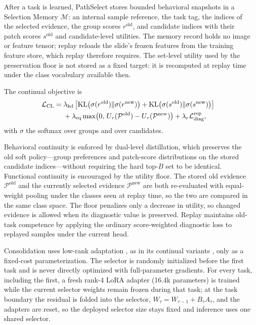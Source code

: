 \documentclass{article}
\def\L{{\cal L}}
\newcommand{\Psel}{\mathcal{P}}
\newcommand{\Mem}{\mathcal{M}}
\begin{document}
After a task is learned, PathSelect stores bounded behavioral snapshots in a Selection Memory $\Mem$: an internal sample reference, the task tag, the indices of the selected evidence, the group scores $r^{\mathrm{old}}$, and candidate indices with their patch scores $s^{\mathrm{old}}$ and candidate-level utilities. The memory record holds no image or feature tensor; replay reloads the slide's frozen features from the training feature store, which replay therefore requires. The set-level utility used by the preservation floor is not stored as a fixed target: it is recomputed at replay time under the class vocabulary available then.

The continual objective is
\begin{align}
\L_{\mathrm{CL}}
={}&
\lambda_{\mathrm{kd}}
\left[
\mathrm{KL}\bigl(\sigma(r^{\mathrm{old}})\Vert \sigma(r^{\mathrm{new}})\bigr)
+
\mathrm{KL}\bigl(\sigma(s^{\mathrm{old}})\Vert \sigma(s^{\mathrm{new}})\bigr)
\right]
\nonumber\\
&+
\lambda_{\mathrm{eq}}
\max\bigl(0,\,U_\tau(\Psel^{\mathrm{old}})-U_\tau(\Psel^{\mathrm{new}})\bigr)
+
\lambda_r \L_{\mathrm{diag}}^{\mathrm{rep}},
\label{eq:lcl}
\end{align}
with $\sigma$ the softmax over groups and over candidates.

Behavioral continuity is enforced by dual-level distillation, which preserves the old soft policy---group preferences and patch-score distributions on the stored candidate indices---without requiring the hard top-$B$ set to be identical. Functional continuity is encouraged by the utility floor. The stored old evidence $\Psel^{\mathrm{old}}$ and the currently selected evidence $\Psel^{\mathrm{new}}$ are both re-evaluated with equal-weight pooling under the classes seen at replay time, so the two are compared in the same class space. The floor penalizes only a decrease in utility, so changed evidence is allowed when its diagnostic value is preserved. Replay maintains old-task competence by applying the ordinary score-weighted diagnostic loss to replayed samples under the current head.

Consolidation uses low-rank adaptation \cite{hu2022lora}, as in its continual variants \cite{liang2024inflora,wu2025sdlora,he2025cllora,chen2026flexem}, only as a fixed-cost parameterization. The selector is randomly initialized before the first task and is never directly optimized with full-parameter gradients. For every task, including the first, a fresh rank-4 LoRA adapter (16.4k parameters) is trained while the current selector weights remain frozen during that task; at the task boundary the residual is folded into the selector, $W_{\tau}=W_{\tau-1}+B_\tau A_\tau$, and the adapters are reset, so the deployed selector size stays fixed and inference uses one shared selector.
\end{document}
